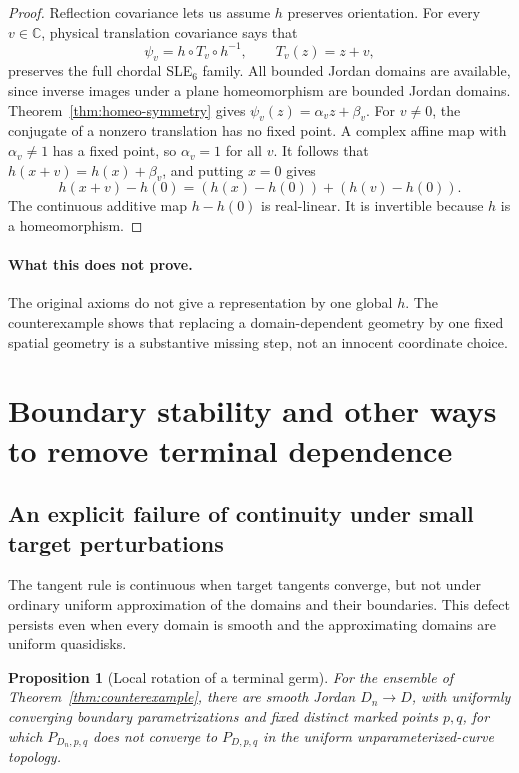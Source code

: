 \documentclass[11pt]{article}
\newtheorem{proposition}[theorem]{Proposition}
\theoremstyle{definition}\newtheorem{definition}[theorem]{Definition}
\theoremstyle{remark}\newtheorem{remark}[theorem]{Remark}
\newcommand{\CC}{\mathbb C}
\begin{document}
\begin{proof}
Reflection covariance lets us assume $h$ preserves orientation. For every
$v\in\CC$, physical translation covariance says that
\[
 \psi_v=h\circ T_v\circ h^{-1},\qquad T_v(z)=z+v,
\]
preserves the full chordal SLE$_6$ family. All bounded Jordan domains are
available, since inverse images under a plane homeomorphism are bounded
Jordan domains. Theorem~\ref{thm:homeo-symmetry} gives
$\psi_v(z)=\alpha_v z+\beta_v$. For $v\ne0$, the conjugate of a nonzero
translation has no fixed point. A complex affine map with
$\alpha_v\ne1$ has a fixed point, so $\alpha_v=1$ for all $v$.
It follows that $h(x+v)=h(x)+\beta_v$, and putting $x=0$ gives
\[
 h(x+v)-h(0)=(h(x)-h(0))+(h(v)-h(0)).
\]
The continuous additive map $h-h(0)$ is real-linear. It is invertible
because $h$ is a homeomorphism.
\end{proof}

\paragraph{What this does not prove.}
The original axioms do not give a representation by one global $h$.
The counterexample shows that replacing a domain-dependent geometry by
one fixed spatial geometry is a substantive missing step, not an
innocent coordinate choice.

\section{Boundary stability and other ways to remove terminal dependence}
\label{sec:boundary-stability}

\subsection{An explicit failure of continuity under small target perturbations}

The tangent rule is continuous when target tangents converge, but not under
ordinary uniform approximation of the domains and their boundaries.
This defect persists even when every domain is smooth and the approximating
domains are uniform quasidisks.

\begin{proposition}[Local rotation of a terminal germ]
\label{prop:boundary-discontinuity}
For the ensemble of Theorem~\ref{thm:counterexample}, there are smooth
Jordan $D_n\to D$, with uniformly converging boundary parametrizations
and fixed distinct marked points $p,q$, for which $P_{D_n,p,q}$ does
not converge to $P_{D,p,q}$ in the uniform unparameterized-curve topology.
\end{proposition}
\end{document}
